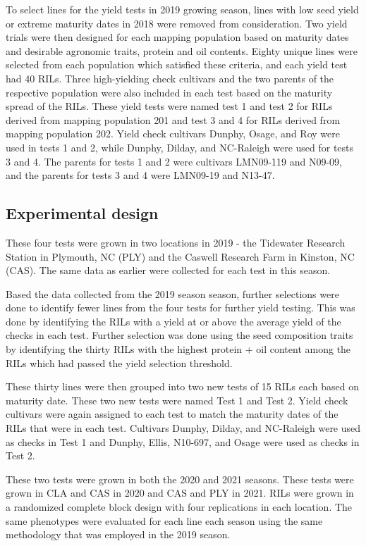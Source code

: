 \documentclass[Agronomy,article,submit,moreauthors,pdftex]{mdpi}
\begin{document}
To select lines for the yield tests in 2019 growing season, lines with
low seed yield or extreme maturity dates in 2018 were removed from
consideration. Two yield trials were then designed for each mapping
population based on maturity dates and desirable agronomic traits,
protein and oil contents. Eighty unique lines were selected from each
population which satisfied these criteria, and each yield test had 40
RILs. Three high-yielding check cultivars and the two parents of the
respective population were also included in each test based on the
maturity spread of the RILs. These yield tests were named test 1 and
test 2 for RILs derived from mapping population 201 and test 3 and 4 for
RILs derived from mapping population 202. Yield check cultivars Dunphy,
Osage, and Roy were used in tests 1 and 2, while Dunphy, Dilday, and
NC-Raleigh were used for tests 3 and 4. The parents for tests 1 and 2
were cultivars LMN09-119 and N09-09, and the parents for tests 3 and 4
were LMN09-19 and N13-47.

\hypertarget{experimental-design}{%
\subsection{Experimental design}\label{experimental-design}}

These four tests were grown in two locations in 2019 - the Tidewater
Research Station in Plymouth, NC (PLY) and the Caswell Research Farm in
Kinston, NC (CAS). The same data as earlier were collected for each test
in this season.

Based the data collected from the 2019 season season, further selections
were done to identify fewer lines from the four tests for further yield
testing. This was done by identifying the RILs with a yield at or above
the average yield of the checks in each test. Further selection was done
using the seed composition traits by identifying the thirty RILs with
the highest protein + oil content among the RILs which had passed the
yield selection threshold.

These thirty lines were then grouped into two new tests of 15 RILs each
based on maturity date. These two new tests were named Test 1 and Test
2. Yield check cultivars were again assigned to each test to match the
maturity dates of the RILs that were in each test. Cultivars Dunphy,
Dilday, and NC-Raleigh were used as checks in Test 1 and Dunphy, Ellis,
N10-697, and Osage were used as checks in Test 2.

These two tests were grown in both the 2020 and 2021 seasons. These
tests were grown in CLA and CAS in 2020 and CAS and PLY in 2021. RILs
were grown in a randomized complete block design with four replications
in each location. The same phenotypes were evaluated for each line each
season using the same methodology that was employed in the 2019 season.
\end{document}
